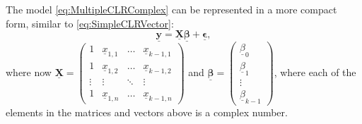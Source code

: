 \documentclass[
]{book}
\begin{document}
The model \eqref{eq:MultipleCLRComplex} can be represented in a more compact form, similar to \eqref{eq:SimpleCLRVector}:
\begin{equation}
    \underline{\mathbf{y}} = \underline{\mathbf{X}} \underline{\boldsymbol{\beta}} + \underline{\boldsymbol{\epsilon}} ,
    \label{eq:CLRVector}
\end{equation}
where now \(\underline{\mathbf{X}} = \begin{pmatrix} 1 & \underline{x}_{1,1} & \dots & \underline{x}_{k-1,1} \\ 1 & \underline{x}_{1,2} & \dots & \underline{x}_{k-1,2} \\ \vdots & \vdots & \ddots & \vdots \\ 1 & \underline{x}_{1,n} & \dots & \underline{x}_{k-1,n} \end{pmatrix}\) and \(\underline{\boldsymbol{\beta}} = \begin{pmatrix} \underline{\beta}_0 \\ \underline{\beta}_1 \\ \vdots \\ \underline{\beta}_{k-1} \end{pmatrix}\), where each of the elements in the matrices and vectors above is a complex number.
\end{document}
